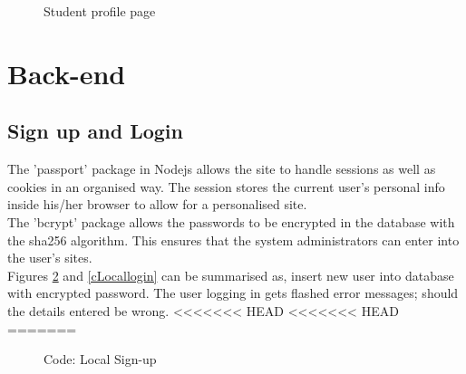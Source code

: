 \documentclass[a4paper,12pt]{article}
\numberwithin{equation}{section} %
\numberwithin{figure}{section}
\begin{document}
\begin{figure}[H]
\centering
{}
\caption{Student profile page}
\label{studentProfile}
\end{figure}

\pagebreak
\section{Back-end}
\subsection{Sign up and Login}
The 'passport' package in Nodejs allows the site to handle sessions as well as cookies in an organised way. The session stores the current user's personal info inside his/her browser to allow for a personalised site.\\
The 'bcrypt' package allows the passwords to be encrypted in the database with the sha256 algorithm. This ensures that the system administrators can enter into the user's sites.\\
Figures \ref{cLocalSignup} and \ref{cLocallogin} can be summarised as, insert new user into database with encrypted password. The user logging in gets flashed error messages; should the details entered be wrong.
<<<<<<< HEAD
<<<<<<< HEAD
=======


\begin{figure}[H]
\centering
{}
\caption{Code: Local Sign-up}
\label{cLocalSignup}
\end{figure}
\end{document}
